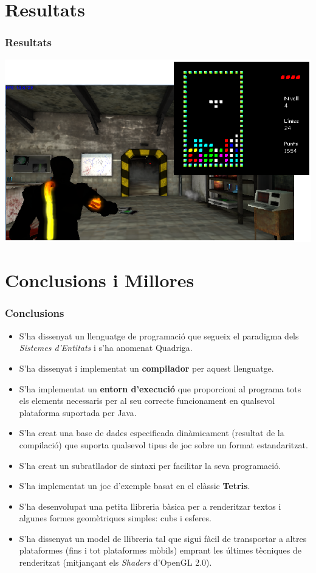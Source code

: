 \documentclass[serif,9pt]{beamer}
\begin{document}
\section{Resultats}

  \begin{frame}\frametitle{Resultats}
    \includegraphics[width=1.00\textwidth]{./img/Screens.png}
  \end{frame}

\section{Conclusions i Millores}

  \begin{frame}\frametitle{Conclusions}
    \begin{itemize}
      \item S'ha dissenyat un llenguatge de programació que segueix el paradigma dels {\em Sistemes d'Entitats} i s'ha anomenat Quadriga.\pause
      \item S'ha dissenyat i implementat un {\bf compilador} per aquest llenguatge.\pause
      \item S'ha implementat un {\bf entorn d'execució} que proporcioni al programa tots els elements necessaris per al seu correcte funcionament en qualsevol plataforma suportada per Java.\pause
      \item S'ha creat una base de dades especificada dinàmicament (resultat de la compilació) que suporta qualsevol tipus de joc sobre un format estandaritzat.\pause
      \item S'ha creat un subratllador de sintaxi per facilitar la seva programació.\pause
      \item S'ha implementat un joc d'exemple basat en el clàssic {\bf Tetris}.\pause
      \item S'ha desenvolupat una petita llibreria bàsica per a renderitzar textos i algunes formes geomètriques simples: cubs i esferes.\pause
      \item S'ha dissenyat un model de llibreria tal que sigui fàcil de transportar a altres plataformes (fins i tot plataformes mòbils) emprant les últimes tècniques de renderitzat (mitjançant els {\em Shaders} d'OpenGL 2.0).
    \end{itemize}
  \end{frame}
  
\end{document}
